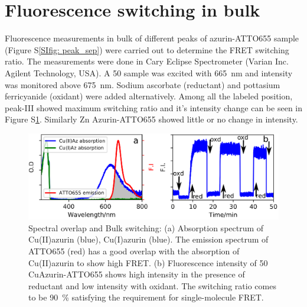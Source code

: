 \documentclass[11pt,a4paper,onecolumn]{article}
\begin{document}
\section{Fluorescence switching in bulk}
Fluorescence measurements in bulk of different peaks of azurin-ATTO655 sample (Figure S\ref{SIfig: peak_sep}) were carried out to determine the FRET switching ratio.
The measurements were done in Cary Eclipse Spectrometer (Varian Inc. Agilent Technology, USA).
A \SI{50}{\nM} sample was excited with \SI{665}{\nm} and intensity was monitored above \SI{675}{\nm}.
Sodium ascorbate (reductant) and pottasium ferricyanide (oxidant) were added alternatively.
Among all the labeled position, peak-III showed maximum switching ratio and it's intensity change can be seen in Figure S\ref{SIfig: switching}.
Similarly Zn Azurin-ATTO655 showed little or no change in intensity.
\begin{figure}
  \centering
  \includegraphics{spectral_overlap_switching.eps}
  \makeatletter
  \renewcommand{\fnum@figure}{\figurename~S\thefigure}
  \makeatother
  \caption{Spectral overlap and Bulk switching: (a) Absorption spectrum of Cu(II)azurin (blue), Cu(I)azurin (blue).
  The emission spectrum of ATTO655 (red) has a good overlap with the absorption of Cu(II)azurin to show high FRET. 
  (b) Fluorescence intensity of \SI{50}{\nM} CuAzurin-ATTO655 shows high intensity in the presence of reductant and low 
  intensity with oxidant.
  The switching ratio comes to be \SI{90}{\percent} satisfying the requirement for single-molecule FRET.}
  \label{SIfig: switching}
\end{figure}
\end{document}
